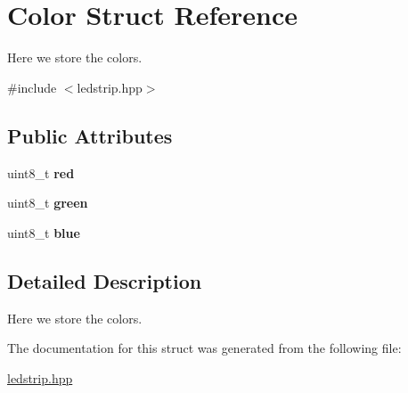 \hypertarget{struct_color}{}\section{Color Struct Reference}
\label{struct_color}


Here we store the colors.  




{\ttfamily \#include $<$ledstrip.\+hpp$>$}

\subsection*{Public Attributes}
\begin{DoxyCompactItemize}
\item 
\mbox{\label{struct_color_a8c55aa73e839e57527559cd732bda475}} 
uint8\+\_\+t {\bfseries red}
\item 
\mbox{\label{struct_color_a4f8414e1814c166da1859ce388149d78}} 
uint8\+\_\+t {\bfseries green}
\item 
\mbox{\label{struct_color_acad45c325d520d1c24ea774099821c7c}} 
uint8\+\_\+t {\bfseries blue}
\end{DoxyCompactItemize}


\subsection{Detailed Description}
Here we store the colors. 

The documentation for this struct was generated from the following file\+:\begin{DoxyCompactItemize}
\item 
\hyperlink{ledstrip_8hpp}{ledstrip.\+hpp}\end{DoxyCompactItemize}
